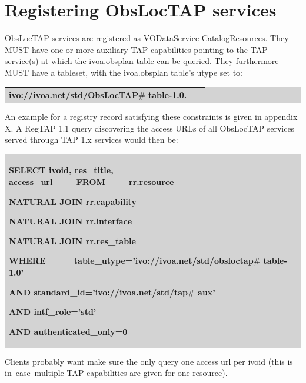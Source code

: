 \documentclass[11pt,a4paper]{ivoa}
\begin{document}
\section{Registering ObsLocTAP services}

ObsLocTAP services are registered as VODataService CatalogResources. They MUST have one or more auxiliary TAP capabilities pointing to the TAP service(s) at which the ivoa.obsplan table can be queried. They furthermore MUST have a tableset, with the ivoa.obsplan table's utype set to:


\bigskip
\par
\begingroup\setlength{\fboxsep}{0pt}
\colorbox{lightgray}{%
\begin{tabular}{|p{5.53in}|}
\hline
ivo://ivoa.net/std/ObsLocTAP$\#$ table-1.0.\ \ \   \\
\hline
\end{tabular}%
}\endgroup
\par
\bigskip


An example for a registry record satisfying these constraints is given in appendix X. A RegTAP 1.1 query discovering the access URLs of all ObsLocTAP services served through TAP 1.x services would then be:      

\bigskip
\par
\begingroup\setlength{\fboxsep}{0pt}
\colorbox{lightgray}{%
\begin{tabular}{|p{5.53in}|}
\hline
SELECT ivoid, res\_title, access\_url\ \ \ \ \ FROM\ \ \ \ \   rr.resource\ \ \ \ \ \   \par NATURAL JOIN rr.capability\ \ \ \ \ \   \par NATURAL JOIN rr.interface\ \ \ \ \ \   \par NATURAL JOIN rr.res\_table\ \ \ \   \par WHERE\ \ \ \ \ \  table\_utype='ivo://ivoa.net/std/obsloctap$\#$ table-1.0'\ \ \ \ \ \   \par AND standard\_id='ivo://ivoa.net/std/tap$\#$ aux'\ \ \ \ \ \   \par AND intf\_role='std'\ \ \ \ \   \par AND authenticated\_only=0\ \  \\
\hline
\end{tabular}%
}\endgroup
\par
\bigskip
Clients probably want make sure the only query one access url per ivoid (this is in\ case\ multiple TAP capabilities are given for one   resource).
\par


\end{document}
